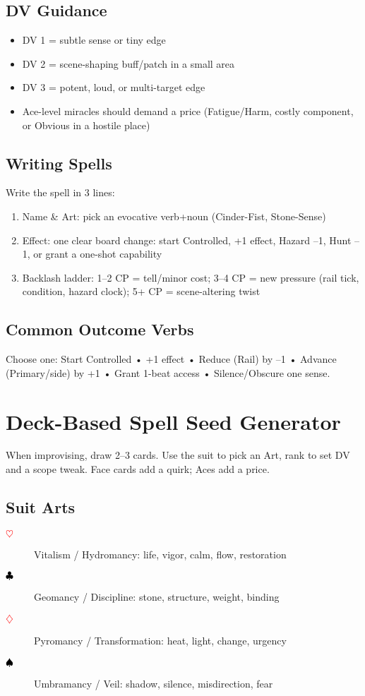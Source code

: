 \subsection{DV Guidance}
\begin{itemize}
\item DV 1 = subtle sense or tiny edge
\item DV 2 = scene-shaping buff/patch in a small area
\item DV 3 = potent, loud, or multi-target edge
\item Ace-level miracles should demand a price (Fatigue/Harm, costly component, or Obvious in a hostile place)
\end{itemize}

\subsection{Writing Spells}
Write the spell in 3 lines:
\begin{enumerate}
\item Name \& Art: pick an evocative verb+noun (Cinder-Fist, Stone-Sense)
\item Effect: one clear board change: start Controlled, +1 effect, Hazard --1, Hunt --1, or grant a one-shot capability
\item Backlash ladder: 1--2 CP = tell/minor cost; 3--4 CP = new pressure (rail tick, condition, hazard clock); 5+ CP = scene-altering twist
\end{enumerate}

\subsection{Common Outcome Verbs}
Choose one: Start Controlled • +1 effect • Reduce (Rail) by --1 • Advance (Primary/side) by +1 • Grant 1-beat access • Silence/Obscure one sense.

\section{Deck-Based Spell Seed Generator}

When improvising, draw 2--3 cards. Use the suit to pick an Art, rank to set DV and a scope tweak. Face cards add a quirk; Aces add a price.

\subsection{Suit Arts}
\begin{description}
\item[\textcolor{red}{$\heartsuit$}] Vitalism / Hydromancy: life, vigor, calm, flow, restoration
\item[\textcolor{black}{$\clubsuit$}] Geomancy / Discipline: stone, structure, weight, binding
\item[\textcolor{red}{$\diamondsuit$}] Pyromancy / Transformation: heat, light, change, urgency
\item[\textcolor{black}{$\spadesuit$}] Umbramancy / Veil: shadow, silence, misdirection, fear
\end{description}

